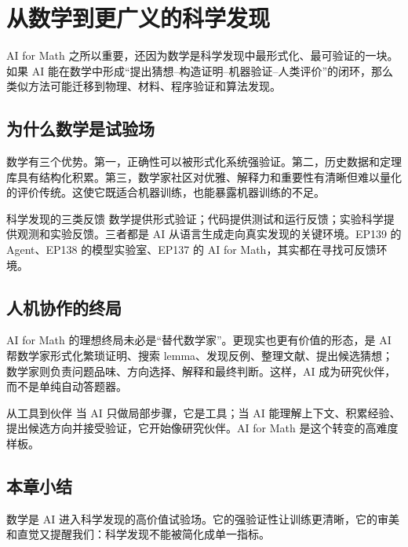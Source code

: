 \section{从数学到更广义的科学发现}

AI for Math 之所以重要，还因为数学是科学发现中最形式化、最可验证的一块。如果 AI 能在数学中形成“提出猜想--构造证明--机器验证--人类评价”的闭环，那么类似方法可能迁移到物理、材料、程序验证和算法发现。

\subsection{为什么数学是试验场}

数学有三个优势。第一，正确性可以被形式化系统强验证。第二，历史数据和定理库具有结构化积累。第三，数学家社区对优雅、解释力和重要性有清晰但难以量化的评价传统。这使它既适合机器训练，也能暴露机器训练的不足。

\begin{knowledgebox}{科学发现的三类反馈}
数学提供形式验证；代码提供测试和运行反馈；实验科学提供观测和实验反馈。三者都是 AI 从语言生成走向真实发现的关键环境。EP139 的 Agent、EP138 的模型实验室、EP137 的 AI for Math，其实都在寻找可反馈环境。
\end{knowledgebox}

\subsection{人机协作的终局}

AI for Math 的理想终局未必是“替代数学家”。更现实也更有价值的形态，是 AI 帮数学家形式化繁琐证明、搜索 lemma、发现反例、整理文献、提出候选猜想；数学家则负责问题品味、方向选择、解释和最终判断。这样，AI 成为研究伙伴，而不是单纯自动答题器。

\begin{importantbox}{从工具到伙伴}
当 AI 只做局部步骤，它是工具；当 AI 能理解上下文、积累经验、提出候选方向并接受验证，它开始像研究伙伴。AI for Math 是这个转变的高难度样板。
\end{importantbox}

\subsection{本章小结}

数学是 AI 进入科学发现的高价值试验场。它的强验证性让训练更清晰，它的审美和直觉又提醒我们：科学发现不能被简化成单一指标。

